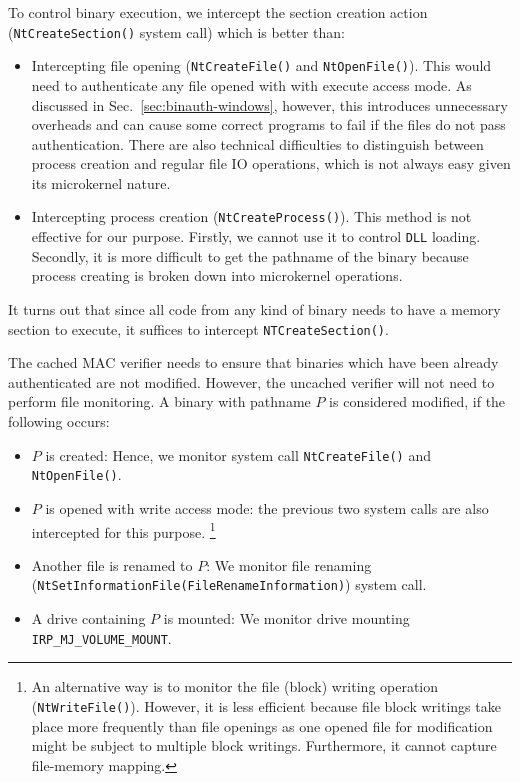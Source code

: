 To control binary execution, we intercept the section creation action 
({\tt NtCreateSection()} system call) which is better than:
\begin{itemize}
\item Intercepting file opening ({\tt NtCreateFile()} and {\tt NtOpenFile()}).
This would need to authenticate any file opened with with execute access mode.
As discussed in Sec.~\ref{sec:binauth-windows}, however, this introduces
unnecessary overheads and can cause some correct programs to fail if the files
do not pass authentication.
There are also technical difficulties to distinguish between
process creation and regular file IO operations, which is not always easy given
its microkernel nature.
\item Intercepting process creation ({\tt NtCreateProcess()}).
This method is not effective for our purpose.
Firstly, we cannot use it to control {\tt DLL} loading.
Secondly, it is more difficult to get the pathname of the binary because
process creating is broken down into microkernel operations.
\end{itemize}
It turns out that since all code from any kind of binary
needs to have a memory section to execute,
it suffices to intercept {\tt NTCreateSection()}.

The cached MAC verifier needs to ensure that binaries which have
been already authenticated are not modified.
However, the uncached verifier will not need to perform file monitoring.
A binary with pathname $P$ is considered modified, if the following occurs:
\begin{itemize}
\item $P$ is created: Hence, we monitor system call
{\tt NtCreateFile()} and {\tt NtOpenFile()}.
\item $P$ is opened with write access mode: the previous two
system calls are also intercepted for this purpose.
\footnote{An alternative way is to monitor the file (block) writing operation ({\tt NtWriteFile()}).
However, it is less efficient because file block writings take place more frequently
than file openings as one opened file for modification might be subject to 
multiple block writings. Furthermore, it cannot capture file-memory mapping.}
\item Another file is renamed to $P$: 
We monitor file renaming ({\tt NtSetInformationFile\linebreak[0](\linebreak[0]FileRenameInformation\linebreak[0])})
system call.
\item A drive containing $P$ is mounted:
We monitor drive mounting {\tt IRP\_MJ\_VOLUME\_MOUNT}.
\end{itemize}

